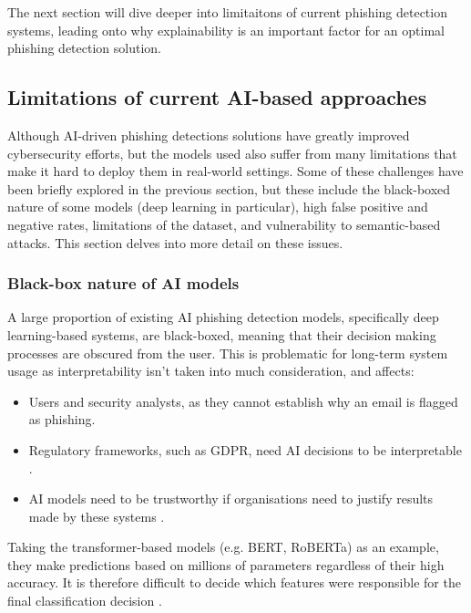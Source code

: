 \noindent The next section will dive deeper into limitaitons of current phishing detection systems, leading onto why explainability is an important factor for an optimal phishing detection solution.

\newpage

\subsection*{Limitations of current AI-based approaches}
Although AI-driven phishing detections solutions have greatly improved cybersecurity efforts, but the models used also suffer from many limitations that make it hard to deploy them in real-world settings. Some of these challenges have been briefly explored in the previous section, but these include the black-boxed nature of some models (deep learning in particular), high false positive and negative rates, limitations of the dataset, and vulnerability to semantic-based attacks. This section delves into more detail on these issues.

\subsubsection*{Black-box nature of AI models}
A large proportion of existing AI phishing detection models, specifically deep learning-based systems, are black-boxed, meaning that their decision making processes are obscured from the user. This is problematic for long-term system usage as interpretability isn't taken into much consideration, and affects:

\begin{itemize}
    \item Users and security analysts, as they cannot establish why an email is flagged as phishing.
    \item Regulatory frameworks, such as GDPR, need AI decisions to be interpretable \citep{doshi2017towards}.
    \item AI models need to be trustworthy if organisations need to justify results made by these systems \citep{ribeiro2016model}.
\end{itemize}

\noindent Taking the transformer-based models (e.g. BERT, RoBERTa) as an example, they make predictions based on millions of parameters regardless of their high accuracy. It is therefore difficult to decide which features were responsible for the final classification decision \citep{jamal2023improved}.\newline

